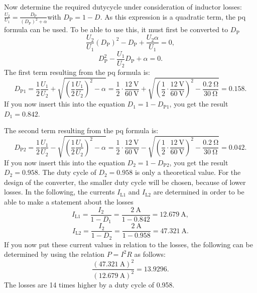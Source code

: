 \begin{solutionblock}
Now determine the required dutycycle under consideration of inductor losses:
$\frac{U_\mathrm{2}}{U_\mathrm{1}}=\frac{D_\mathrm{P}}{(D_\mathrm{P})^2+\alpha}$with $D_\mathrm{P}=1-D$.
As this expression is a quadratic term, the pq formula can be used. To be able to use this, it must first be converted to $D_\mathrm{P}$
\begin{equation}
    \frac{U_\mathrm{2}}{U_\mathrm{1}}(D_\mathrm{P})^2-D_\mathrm{P}+\frac{U_\mathrm{2}\alpha}{U_\mathrm{1}}=0,
\end{equation}
\begin{equation}
    D_\mathrm{P}^2 - \frac{U_\mathrm{1}}{U_\mathrm{2}} D_\mathrm{P}+\alpha=0.
\end{equation}
The first term resulting from the pq formula is:
\begin{equation}
    D_\mathrm{P1}=\frac{1}{2}\frac{U_\mathrm{1}}{U_\mathrm{2}}+\sqrt{\left(\frac{1}{2}\frac{U_\mathrm{1}}{U_\mathrm{2}}\right)^2-\alpha}= \frac{1}{2}\cdot\frac{\SI{12}{\volt}}{\SI{60}{\volt}}+\sqrt{\left({\frac{1}{2}}\cdot\frac{\SI{12}{\volt}}{\SI{60}{\volt}}\right)^2-\frac{\SI{0.2}{\ohm}}{\SI{30}{\ohm}}}= 0.158.
\end{equation}
If you now insert this into the equation $D_\mathrm{1}=1-D_\mathrm{P1}$, you get the result $D_\mathrm{1}=0.842$.

The second term resulting from the pq formula is:
\begin{equation}
    D_\mathrm{P2}=\frac{1}{2}\frac{U_\mathrm{1}}{U_\mathrm{2}}-\sqrt{\left(\frac{1}{2}\frac{U_\mathrm{1}}{U_\mathrm{2}}\right)^2-\alpha}= \frac{1}{2}\cdot\frac{\SI{12}{\volt}}{\SI{60}{\volt}}-\sqrt{\left({\frac{1}{2}}\cdot\frac{\SI{12}{\volt}}{\SI{60}{\volt}}\right)^2-\frac{\SI{0.2}{\ohm}}{\SI{30}{\ohm}}}= 0.042.
\end{equation}
If you now insert this into the equation $D_\mathrm{2}=1-D_\mathrm{P2}$, you get the result $D_\mathrm{2}=0.958$.
The duty cycle of $D_\mathrm{2}=0.958$ is only a theoretical value. For the design of the converter, the smaller duty cycle will be chosen, because of lower losses.
In the following, the currents $I_\mathrm{L1}$ and $I_\mathrm{L2}$ are determined in order to be able to make a statement about the losses
\begin{equation}
    I_\mathrm{L1} = \frac{I_\mathrm{2}}{1-D_\mathrm{1}}= \frac{\SI{2}{\ampere}}{1-0.842}=\SI{12.679}{\ampere},
\end{equation}
\begin{equation}
    I_\mathrm{L2} = \frac{I_\mathrm{2}}{1-D_\mathrm{2}}= \frac{\SI{2}{\ampere}}{1-0.958}=\SI{47.321}{\ampere}.
\end{equation}
If you now put these current values in relation to the losses, the following can be determined by using the relation $P=I^2R$ as follows:
\begin{equation}
    \frac{(\SI{47.321}{\ampere})^2}{(\SI{12.679}{\ampere})^2}=13.9296.
\end{equation}
The losses are 14 times higher by a duty cycle of 0.958. 



\end{solutionblock}
